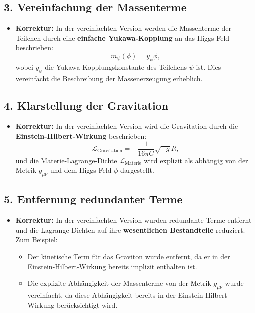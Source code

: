 \documentclass{article}
\begin{document}
\subsection{3. Vereinfachung der Massenterme}

\begin{itemize}
	\item \textbf{Korrektur:} In der vereinfachten Version werden die Massenterme der Teilchen durch eine \textbf{einfache Yukawa-Kopplung} an das Higgs-Feld beschrieben:
	\[
	m_\psi(\phi) = y_\psi \phi,
	\]
	wobei $y_\psi$ die Yukawa-Kopplungskonstante des Teilchens $\psi$ ist. Dies vereinfacht die Beschreibung der Massenerzeugung erheblich.
\end{itemize}

\subsection{4. Klarstellung der Gravitation}

\begin{itemize}
	\item \textbf{Korrektur:} In der vereinfachten Version wird die Gravitation durch die \textbf{Einstein-Hilbert-Wirkung} beschrieben:
	\[
	\mathcal{L}_\text{Gravitation} = -\frac{1}{16\pi G} \sqrt{-g} R,
	\]
	und die Materie-Lagrange-Dichte $\mathcal{L}_\text{Materie}$ wird explizit als abhängig von der Metrik $g_{\mu\nu}$ und dem Higgs-Feld $\phi$ dargestellt.
\end{itemize}

\subsection{5. Entfernung redundanter Terme}

\begin{itemize}
	\item \textbf{Korrektur:} In der vereinfachten Version wurden redundante Terme entfernt und die Lagrange-Dichten auf ihre \textbf{wesentlichen Bestandteile} reduziert. Zum Beispiel:
	\begin{itemize}
		\item Der kinetische Term für das Graviton wurde entfernt, da er in der Einstein-Hilbert-Wirkung bereits implizit enthalten ist.
		\item Die explizite Abhängigkeit der Massenterme von der Metrik $g_{\mu\nu}$ wurde vereinfacht, da diese Abhängigkeit bereits in der Einstein-Hilbert-Wirkung berücksichtigt wird.
	\end{itemize}
\end{itemize}
\end{document}
